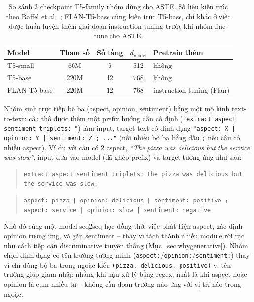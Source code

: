 \documentclass[11pt,a4paper]{article}
\begin{document}
\begin{table}[h]
\centering
\begin{tabular}{lcccl}
\toprule
Model & Tham số & Số tầng & $d_{\text{model}}$ & Pretrain thêm \\
\midrule
T5-small & 60M & 6 & 512 & không \\
T5-base & 220M & 12 & 768 & không \\
FLAN-T5-base & 220M & 12 & 768 & instruction tuning (Flan) \\
\bottomrule
\end{tabular}
\caption{So sánh 3 checkpoint T5-family nhóm dùng cho ASTE. Số liệu kiến
trúc theo Raffel et al.~\cite{t5}; FLAN-T5-base cùng kiến trúc T5-base,
chỉ khác ở việc được huấn luyện thêm giai đoạn instruction tuning trước
khi nhóm fine-tune cho ASTE.}
\label{tab:t5-sizes}
\end{table}

Nhóm sinh trực tiếp bộ ba (aspect, opinion, sentiment) bằng một mô hình
text-to-text: câu thô được thêm một prefix hướng dẫn cố định
(\texttt{"extract aspect sentiment triplets: "}) làm input, target text có
định dạng \texttt{"aspect: X | opinion: Y | sentiment: Z ; ..."} (nối nhiều
bộ ba bằng dấu \texttt{;} nếu câu có nhiều aspect). Ví dụ với câu có 2
aspect, \emph{``The pizza was delicious but the service was slow''}, input
đưa vào model (đã ghép prefix) và target tương ứng như sau:

\begin{quote}
\small
\texttt{extract aspect sentiment triplets: The pizza was delicious but} \\
\texttt{the service was slow.}
\end{quote}

\begin{quote}
\small
\texttt{aspect: pizza | opinion: delicious | sentiment: positive ;} \\
\texttt{aspect: service | opinion: slow | sentiment: negative}
\end{quote}

Nhờ đó cùng một model seq2seq học đồng thời việc phát hiện aspect, xác
định opinion tương ứng, và gán sentiment -- thay vì tách thành nhiều
module rời rạc như cách tiếp cận discriminative truyền thống
(Mục~\ref{sec:whygenerative}). Nhóm chọn định dạng có tên trường tường
minh (\texttt{aspect:}/\texttt{opinion:}/\texttt{sentiment:}) thay vì chỉ
dùng bộ ba trong ngoặc kiểu \texttt{(pizza, delicious, positive)} vì tên
trường giúp giảm nhập nhằng khi hậu xử lý bằng regex, nhất là khi aspect
hoặc opinion là cụm nhiều từ -- không cần đoán trường nào ứng với vị trí
nào trong ngoặc.
\end{document}
